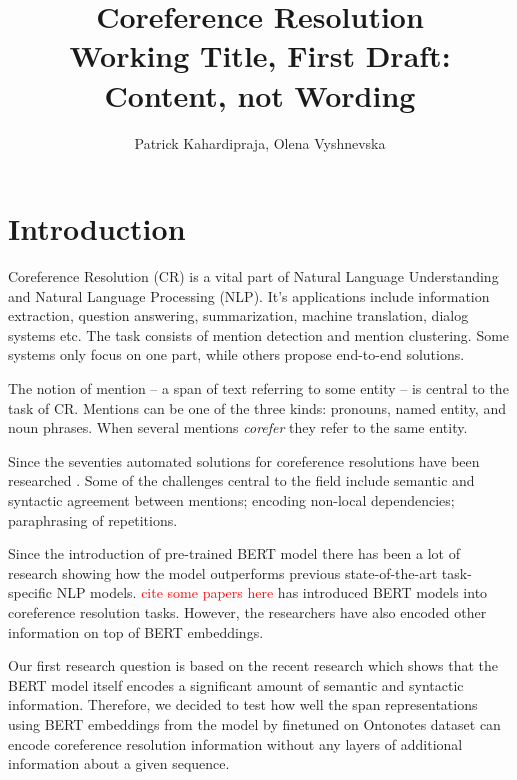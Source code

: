 \documentclass[11pt]{article}
\title{{\LARGE Coreference Resolution}\\[1.5mm]
{\large Working Title, First Draft: Content, not Wording}\\[1.5mm]} %
\author{Patrick Kahardipraja, Olena Vyshnevska}%
\date{} %
\newcommand\todo[1]{\textcolor{red}{#1}}
\begin{document}
\maketitle


\section{Introduction}

Coreference Resolution (CR) is a vital part of Natural Language Understanding and Natural Language Processing (NLP). It's applications include information extraction, question answering, summarization, machine translation, dialog systems etc. The task consists of mention detection and mention clustering. Some systems only focus on one part, while others propose end-to-end solutions.

The notion of mention -- a span of text referring to some entity -- is central to the task of CR. Mentions can be one of the three kinds: pronouns, named entity, and noun phrases. When several mentions \textit{corefer} they refer to the same entity. 

Since the seventies automated solutions for coreference resolutions have been researched \parencite{woods1972, winograd1972, hobbs1978}. Some of the challenges central to the field include semantic and syntactic agreement between mentions; encoding non-local dependencies; paraphrasing of repetitions.





Since the introduction of pre-trained BERT model  \parencite{devlin2019bert} there has been a lot of research showing how the model outperforms previous state-of-the-art task-specific NLP models. \todo{cite some papers here} %
\textcite{joshi2019coref} has introduced BERT models into coreference resolution tasks. However, the researchers have also encoded other information on top of BERT embeddings. 

Our first research question is based on the recent research which shows that the BERT model itself encodes a significant amount of semantic and syntactic information. Therefore, we decided to test how well the span representations using BERT embeddings from the model by \textcite{joshi2019coref} finetuned on Ontonotes dataset \parencite{conll}  can encode coreference resolution information without any layers of additional information about a given sequence. 
\end{document}

